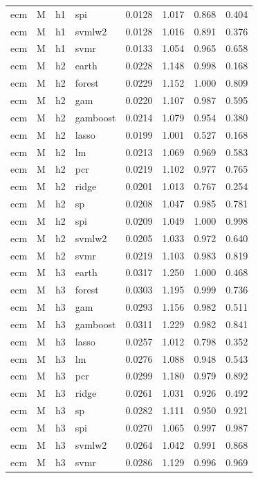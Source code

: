 \begin{ThreePartTable}
\begin{longtable}[t]{llclcccc}
ecm & M & h1 & spi & 0.0128 & 1.017 & 0.868 & 0.404\\
ecm & M & h1 & svmlw2 & 0.0128 & 1.016 & 0.891 & 0.376\\
ecm & M & h1 & svmr & 0.0133 & 1.054 & 0.965 & 0.658\\
\addlinespace
ecm & M & h2 & earth & 0.0228 & 1.148 & 0.998 & 0.168\\
ecm & M & h2 & forest & 0.0229 & 1.152 & 1.000 & 0.809\\
ecm & M & h2 & gam & 0.0220 & 1.107 & 0.987 & 0.595\\
ecm & M & h2 & gamboost & 0.0214 & 1.079 & 0.954 & 0.380\\
ecm & M & h2 & lasso & 0.0199 & 1.001 & 0.527 & 0.168\\
ecm & M & h2 & lm & 0.0213 & 1.069 & 0.969 & 0.583\\
ecm & M & h2 & pcr & 0.0219 & 1.102 & 0.977 & 0.765\\
ecm & M & h2 & ridge & 0.0201 & 1.013 & 0.767 & 0.254\\
ecm & M & h2 & sp & 0.0208 & 1.047 & 0.985 & 0.781\\
ecm & M & h2 & spi & 0.0209 & 1.049 & 1.000 & 0.998\\
ecm & M & h2 & svmlw2 & 0.0205 & 1.033 & 0.972 & 0.640\\
ecm & M & h2 & svmr & 0.0219 & 1.103 & 0.983 & 0.819\\
\addlinespace
ecm & M & h3 & earth & 0.0317 & 1.250 & 1.000 & 0.468\\
ecm & M & h3 & forest & 0.0303 & 1.195 & 0.999 & 0.736\\
ecm & M & h3 & gam & 0.0293 & 1.156 & 0.982 & 0.511\\
ecm & M & h3 & gamboost & 0.0311 & 1.229 & 0.982 & 0.841\\
ecm & M & h3 & lasso & 0.0257 & 1.012 & 0.798 & 0.352\\
ecm & M & h3 & lm & 0.0276 & 1.088 & 0.948 & 0.543\\
ecm & M & h3 & pcr & 0.0299 & 1.180 & 0.979 & 0.892\\
ecm & M & h3 & ridge & 0.0261 & 1.031 & 0.926 & 0.492\\
ecm & M & h3 & sp & 0.0282 & 1.111 & 0.950 & 0.921\\
ecm & M & h3 & spi & 0.0270 & 1.065 & 0.997 & 0.987\\
ecm & M & h3 & svmlw2 & 0.0264 & 1.042 & 0.991 & 0.868\\
ecm & M & h3 & svmr & 0.0286 & 1.129 & 0.996 & 0.969\\

\end{longtable}
\end{ThreePartTable}

